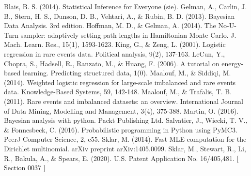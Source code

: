 \documentclass[twoside]{article}
\begin{document}
\begin{thebibliography}{20}

Blais, B. S. (2014). Statistical Inference for Everyone (sie).
Gelman, A., Carlin, J. B., Stern, H. S., Dunson, D. B., Vehtari, A., \& Rubin, B. D. (2013). Bayesian Data Analysis. 3rd edition.
Hoffman, M. D., \& Gelman, A. (2014). The No-U-Turn sampler: adaptively setting path lengths in Hamiltonian Monte Carlo. J. Mach. Learn. Res., 15(1), 1593-1623.
King, G., \& Zeng, L. (2001). Logistic regression in rare events data. Political analysis, 9(2), 137-163.
LeCun, Y., Chopra, S., Hadsell, R., Ranzato, M., \& Huang, F. (2006). A tutorial on energy-based learning. Predicting structured data, 1(0).
Maalouf, M., \& Siddiqi, M. (2014). Weighted logistic regression for large-scale imbalanced and rare events data. Knowledge-Based Systems, 59, 142-148.
Maalouf, M., \& Trafalis, T. B. (2011). Rare events and imbalanced datasets: an overview. International Journal of Data Mining, Modelling and Management, 3(4), 375-388.
Martin, O. (2016). Bayesian analysis with python. Packt Publishing Ltd.
Salvatier, J., Wiecki, T. V., \& Fonnesbeck, C. (2016). Probabilistic programming in Python using PyMC3. PeerJ Computer Science, 2, e55.
Sklar, M. (2014). Fast MLE computation for the Dirichlet multinomial. arXiv preprint arXiv:1405.0099.
Sklar, M., Stewart, R., Li, R., Bakula, A., \& Spears, E. (2020). U.S. Patent Application No. 16/405,481. [ Section 0037 ]

\end{thebibliography}
\end{document}
